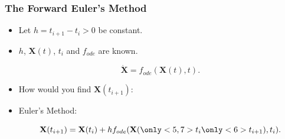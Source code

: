 \documentclass{beamer}
\begin{document}
\begin{frame}
\begin{columns}
\begin{column}{0.5\linewidth}
\frametitle{The Forward Euler's Method}
\begin{itemize}
\item<1-> Let $h=t_{i+1}-t_i>0$ be constant.

\item<2-> $h$, $\mathbf{X}(t)$, $t_i$ and $f_{ode}$ are known.

\begin{equation*}
\dot{\mathbf{X}} = f_{ode}(\mathbf{X}(t),t).
\end{equation*}

\item<3-> How would you find $\mathbf{X}(t_{i+1})$:

\item<5->  Euler's Method:

\begin{equation*}
\mathbf{X}(t_{i+1}) = \mathbf{X}(t_{i})+h f_{ode}(\mathbf{X}(\only<5,7>{t_i}\only<6>{t_{i+1}}),t_i).
\end{equation*}



\end{itemize}
\end{column}
\end{columns}
\end{frame}
\end{document}
